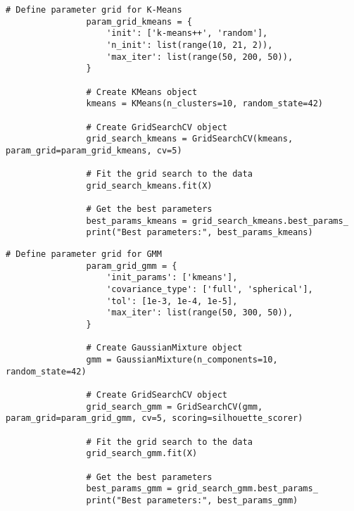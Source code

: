             \begin{lstlisting}[caption={Grid Search for k-Means Clustering}, label={lst:grid_search_kmeans}]
                # Define parameter grid for K-Means
                param_grid_kmeans = {
                    'init': ['k-means++', 'random'],
                    'n_init': list(range(10, 21, 2)),
                    'max_iter': list(range(50, 200, 50)),
                }
                
                # Create KMeans object
                kmeans = KMeans(n_clusters=10, random_state=42)
                
                # Create GridSearchCV object
                grid_search_kmeans = GridSearchCV(kmeans, param_grid=param_grid_kmeans, cv=5)
                
                # Fit the grid search to the data
                grid_search_kmeans.fit(X)
                
                # Get the best parameters
                best_params_kmeans = grid_search_kmeans.best_params_
                print("Best parameters:", best_params_kmeans)
            \end{lstlisting}

            \begin{lstlisting}[caption={Grid Search for Gaussian Mixture Model (GMM)}, label={lst:grid_search_gmm}]
                # Define parameter grid for GMM
                param_grid_gmm = {
                    'init_params': ['kmeans'],
                    'covariance_type': ['full', 'spherical'],
                    'tol': [1e-3, 1e-4, 1e-5],
                    'max_iter': list(range(50, 300, 50)),
                }
                
                # Create GaussianMixture object
                gmm = GaussianMixture(n_components=10, random_state=42)
                
                # Create GridSearchCV object
                grid_search_gmm = GridSearchCV(gmm, param_grid=param_grid_gmm, cv=5, scoring=silhouette_scorer)
                
                # Fit the grid search to the data
                grid_search_gmm.fit(X)
                
                # Get the best parameters
                best_params_gmm = grid_search_gmm.best_params_
                print("Best parameters:", best_params_gmm)
            \end{lstlisting}

